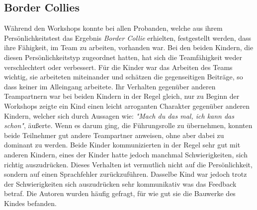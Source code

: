 	\subsection{Border Collies}
		Während den Workshops konnte bei allen Probanden, welche aus ihrem Persönlichkeitstest das Ergebnis \textit{Border Collie} erhielten, festgestellt werden, dass ihre Fähigkeit, im Team zu arbeiten, vorhanden war. Bei den beiden Kindern, die diesen Persönlichkeitstyp zugeordnet hatten, hat sich die Teamfähigkeit weder verschlechtert oder verbessert. Für die Kinder war das Arbeiten des Teams wichtig, sie arbeiteten miteinander und schätzen die gegenseitigen Beiträge, so dass keiner im Alleingang arbeitete. Ihr Verhalten gegenüber anderen Teampartnern war bei beiden Kindern in der Regel gleich, nur zu Beginn der Workshops zeigte ein Kind einen leicht arroganten Charakter gegenüber anderen Kindern, welcher sich durch Aussagen wie: \textit{"Mach du das mal, ich kann das schon"}, äußerte. Wenn es darum ging, die Führungsrolle zu übernehmen, konnten beide Teilnehmer gut andere Teampartner anweisen, ohne aber dabei zu dominant zu werden. Beide Kinder kommunizierten in der Regel sehr gut mit anderen Kindern, eines der Kinder hatte jedoch manchmal Schwierigkeiten, sich richtig auszudrücken. Dieses Verhalten ist vermutlich nicht auf die Persönlichkeit, sondern auf einen Sprachfehler zurückzuführen. Dasselbe Kind war jedoch trotz der Schwierigkeiten sich auszudrücken sehr kommunikativ was das Feedback betraf. Die Autoren wurden häufig gefragt, für wie gut sie die Bauwerke des Kindes befanden.
		
